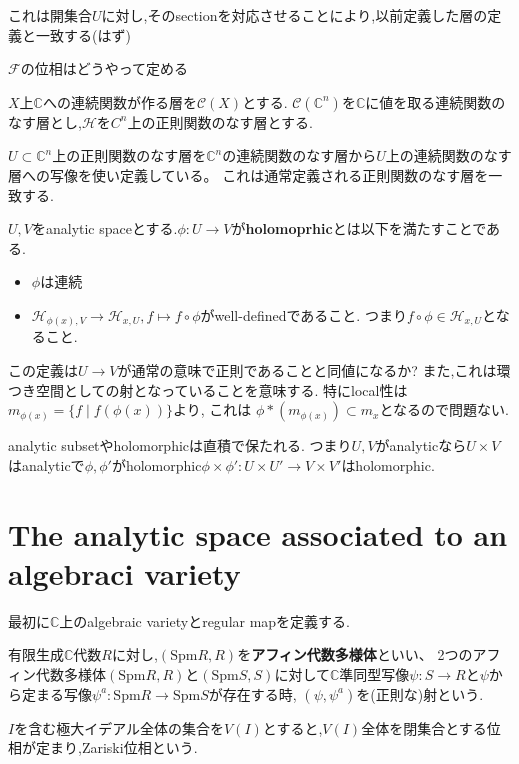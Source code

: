 これは開集合$U$に対し,そのsectionを対応させることにより,以前定義した層の定義と一致する(はず)


\begin{rem}[疑問]
$\mathcal{F}$の位相はどうやって定める
\end{rem}

$X$上$\mathbb{C}$への連続関数が作る層を$\mathcal{C}(X)$とする.
$\mathcal{C}(\mathbb{C}^n)$を$\mathbb{C}$に値を取る連続関数のなす層とし,$\mathcal{H}$を$C^n$上の正則関数のなす層とする.



\begin{rem}[疑問]
$U \subset \mathbb{C}^n$上の正則関数のなす層を$\mathbb{C}^n$の連続関数のなす層から$U$上の連続関数のなす層への写像を使い定義している。
これは通常定義される正則関数のなす層を一致する.
\end{rem}

\begin{screen}
\begin{dfn}
 $U,V$をanalytic spaceとする.$\phi: U \to V$が\textbf{holomoprhic}とは以下を満たすことである.
 \begin{itemize}
   \item $\phi$は連続
   \item $\mathcal{H}_{\phi(x), V} \to \mathcal{H}_{x, U}, f \mapsto f \circ \phi$がwell-definedであること.
         つまり$f \circ \phi \in \mathcal{H}_{x, U}$となること.
 \end{itemize}
\end{dfn}
\end{screen}

\begin{rem}
この定義は$U \to V$が通常の意味で正則であることと同値になるか?
また,これは環つき空間としての射となっていることを意味する.
特にlocal性は$m_{\phi(x)} = \{f \mid f(\phi(x))\}$より, これは $\phi*(m_{\phi(x)}) \subset m_{x}$となるので問題ない.
\end{rem}

analytic subsetやholomorphicは直積で保たれる.
つまり$U, V$がanalyticなら$U \times V$はanalyticで$\phi, \phi'$がholomorphic$\phi \times \phi' : U \times U' \to V \times V'$はholomorphic.


\section{The analytic space associated to an algebraci variety}
最初に$\mathbb{C}$上のalgebraic varietyとregular mapを定義する.

\begin{screen}
\begin{dfn}
有限生成$\mathbb{C}$代数$R$に対し,$(\mathrm{Spm}R, R)$を\textbf{アフィン代数多様体}といい、
2つのアフィン代数多様体$(\mathrm{Spm}R, R)$と$(\mathrm{Spm}S, S)$に対して$\mathbb{C}$準同型写像$\psi: S \to R$と$\psi$から定まる写像$\psi^a: \mathrm{Spm}R \to \mathrm{Spm}S$が存在する時,
$(\psi, \psi^a)$を(正則な)射という.
\end{dfn}
\end{screen}
$I$を含む極大イデアル全体の集合を$V(I)$とすると,$V(I)$全体を閉集合とする位相が定まり,Zariski位相という.

